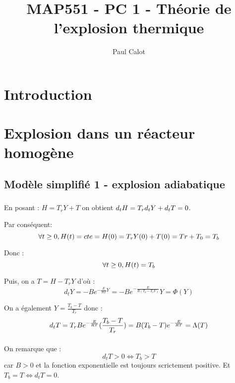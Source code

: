 \documentclass[10pt,a4paper]{report}
\author{Paul Calot}
\title{MAP551 - PC 1 - Théorie de l’explosion thermique}
\begin{document}
\maketitle

\tableofcontents

\chapter{Introduction}

\chapter{Explosion dans un réacteur homogène}

\section{Modèle simplifié 1 - explosion adiabatique}

\subsection{ }

\subsubsection{} 

En posant : $ H = T_r Y + T $ on obtient $d_tH = T_r \space d_tY+d_tT = 0$. 

Par conséquent:  $$\forall t \geq 0, \space H(t) = cte = H(0) = T_r Y(0) + T(0) = Tr + T_0 = T_b $$

Donc : $$\forall t \geq 0, \space H(t) = T_b$$

Puis, on a $T= H-T_rY$ d'où : 
$$ d_tY = -B e^{-\frac{E}{RT}Y} = -B e^{-\frac{E}{R(T_b-T_rY)}} Y = \Phi(Y)$$

On a également $Y= \frac{T_b-T}{T_r}$ donc : 
$$ d_tT = T_r \space B e^{-\frac{E}{RT}} (\frac{T_b-T}{T_r}) = B \space (T_b-T) e^{-\frac{E}{RT}}  = \Lambda(T)$$

\subsubsection{} %

On remarque que : $$ d_tT > 0 \Leftrightarrow T_b > T $$ car $B>0$ et la fonction exponentielle est toujours scrictement positive. Et $T_b = T \Leftrightarrow d_t T = 0$.
\end{document}
